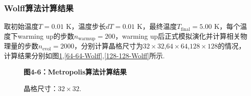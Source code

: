 \documentclass[UTF8,10pt,a4paper]{article}
\theoremstyle{Problem}
\theoremstyle{Solution}
\begin{document}
\clearpage

\subsubsection{Wolff算法计算结果}

取初始温度$T=0.01$ K，温度步长$dT=0.01$ K，最终温度$T_{\text{final}}=5.00$ K，每个温度下warming up的步数$n_{\text{warmup}}=200$，warming up后正式模拟演化并计算相关物理量的步数$n_{\text{evol}}=2000$，分别计算晶格尺寸为$32\times 32$,$64\times 64$,$128\times 128$的情况，计算结果分别如图\ref{32-32-Wolff},\ref{64-64-Wolff},\ref{128-128-Wolff}所示.

\begin{figure}[ht]
    \centering

    \textbf{图4-6：Metropolis算法计算结果}\\

    \caption{晶格尺寸：$32\times 32$.}
    \label{32-32-Wolff}


\end{figure}
\end{document}
